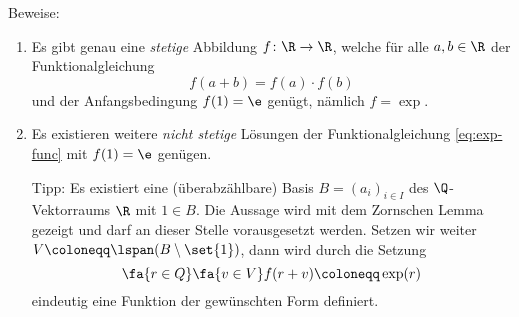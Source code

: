 \begin{exercise}
  Beweise:
  \begin{enumerate}
  \item Es gibt genau eine \emph{stetige} Abbildung $f \colon \R \to \R$, welche
    für alle $a, b \in \R$ der Funktionalgleichung
    \begin{equation}
      \label{eq:exp-func}
      f(a + b) = f(a) \cdot f(b)
    \end{equation}
    und der Anfangsbedingung $f(1) = \e$ genügt, nämlich $f = \exp$.
  \item Es existieren weitere \emph{nicht stetige} Lösungen der
    Funktionalgleichung \ref{eq:exp-func} mit $f(1) = \e$ genügen.

    Tipp: Es existiert eine (überabzählbare) Basis $B = (a_i)_{i \in I}$ des
    $\Q$-Vektorraums $\R$ mit $1 \in B$. Die Aussage wird mit dem Zornschen
    Lemma gezeigt und darf an dieser Stelle vorausgesetzt werden. Setzen wir
    weiter $V \coloneqq \lspan(B \setminus \set{1})$, dann wird durch die
    Setzung
    \begin{equation*}
      \fa{r \in Q} \fa{v \in V} f(r + v) \coloneqq \exp(r)
    \end{equation*}
    eindeutig eine Funktion der gewünschten Form definiert.
  \end{enumerate}
\end{exercise}
